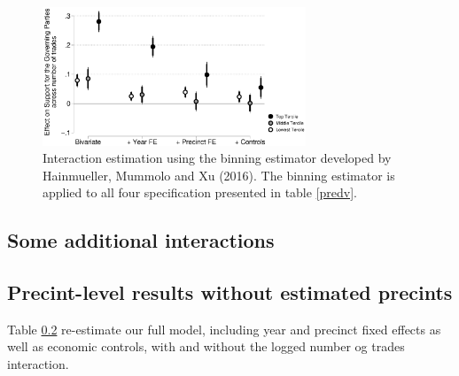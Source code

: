 \documentclass[12pt,a4paper]{article}
\begin{document}
			
			\begin{figure}
				\includegraphics[width=0.7\textwidth]{../figures/localactivity_sup.eps}
				
				\caption{Interaction estimation using the binning estimator developed by Hainmueller, Mummolo and Xu (2016). The binning estimator is applied to all four specification presented in table \ref{predv}. }
				\label{terciles}
			\end{figure}
			
			\newpage
			
			\subsection{Some additional interactions} \label{add_interaction}
				\setcounter{table}{0}
			\setcounter{figure}{0}
			
			
						
			\newpage
			
			\subsection{Precint-level results without estimated precints} \label{calc}
				\setcounter{table}{0}
			\setcounter{figure}{0}
			
			Table \ref{calc} re-estimate our full model, including year and precinct fixed effects as well as economic controls, with and without the logged number og trades interaction.  
			
			
			
			
		
\end{document}
